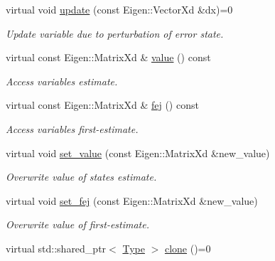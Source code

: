 \begin{DoxyCompactItemize}
virtual void \hyperlink{classov__type_1_1Type_a4e133d50af35f07bd97f73590fe31000}{update} (const Eigen\+::\+Vector\+Xd \&dx)=0
\begin{DoxyCompactList}\small\item\em Update variable due to perturbation of error state. \end{DoxyCompactList}\item 
\mbox{\label{classov__type_1_1Type_a578c16c3fe70fd4a0b33c4c39c777b33}} 
virtual const Eigen\+::\+Matrix\+Xd \& \hyperlink{classov__type_1_1Type_a578c16c3fe70fd4a0b33c4c39c777b33}{value} () const
\begin{DoxyCompactList}\small\item\em Access variable\textquotesingle{}s estimate. \end{DoxyCompactList}\item 
\mbox{\label{classov__type_1_1Type_a85a032ffd5c9a04bf7f582f31cdb4bb2}} 
virtual const Eigen\+::\+Matrix\+Xd \& \hyperlink{classov__type_1_1Type_a85a032ffd5c9a04bf7f582f31cdb4bb2}{fej} () const
\begin{DoxyCompactList}\small\item\em Access variable\textquotesingle{}s first-\/estimate. \end{DoxyCompactList}\item 
virtual void \hyperlink{classov__type_1_1Type_a81c73f0b6c10f2550a487019a59796a9}{set\+\_\+value} (const Eigen\+::\+Matrix\+Xd \&new\+\_\+value)
\begin{DoxyCompactList}\small\item\em Overwrite value of state\textquotesingle{}s estimate. \end{DoxyCompactList}\item 
virtual void \hyperlink{classov__type_1_1Type_ab8345946b27cb43e0cfc36454a06686d}{set\+\_\+fej} (const Eigen\+::\+Matrix\+Xd \&new\+\_\+value)
\begin{DoxyCompactList}\small\item\em Overwrite value of first-\/estimate. \end{DoxyCompactList}\item 
\mbox{\label{classov__type_1_1Type_ab4a020332074ebad50d59427a80fefd6}} 
virtual std\+::shared\+\_\+ptr$<$ \hyperlink{classov__type_1_1Type}{Type} $>$ \hyperlink{classov__type_1_1Type_ab4a020332074ebad50d59427a80fefd6}{clone} ()=0

\end{DoxyCompactItemize}
